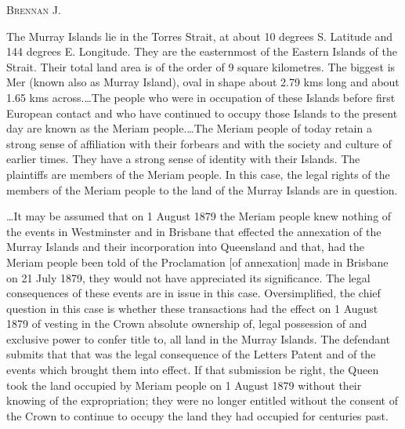 

\opinion \textsc{Brennan} J. 

The Murray Islands lie in the Torres Strait, at about 10 degrees S. Latitude and
144 degrees E. Longitude. They are the easternmost of the Eastern Islands of the
Strait. Their total land area is of the order of 9 square kilometres. The
biggest is Mer (known also as Murray Island), oval in shape about 2.79 kms long
and about 1.65 kms across.\ldots The people who were in occupation of these
Islands before first European contact and who have continued to occupy those
Islands to the present day are known as the Meriam people.\ldots The Meriam
people of today retain a strong sense of affiliation with their forbears and
with the society and culture of earlier times. They have a strong sense of
identity with their Islands. The plaintiffs are members of the Meriam people. In
this case, the legal rights of the members of the Meriam people to the land of
the Murray Islands are in question.

\ldots It may be assumed that on 1 August 1879 the Meriam people knew nothing of
the events in Westminster and in Brisbane that effected the annexation of the
Murray Islands and their incorporation into Queensland and that, had the Meriam
people been told of the Proclamation [of annexation] made in Brisbane on 21 July
1879, they would not have appreciated its significance. The legal consequences
of these events are in issue in this case. Oversimplified, the chief question in
this case is whether these transactions had the effect on 1 August 1879 of
vesting in the Crown absolute ownership of, legal possession of and exclusive
power to confer title to, all land in the Murray Islands. The defendant submits
that that was the legal consequence of the Letters Patent and of the events
which brought them into effect. If that submission be right, the Queen took the
land occupied by Meriam people on 1 August 1879 without their knowing of the
expropriation; they were no longer entitled without the consent of the Crown to
continue to occupy the land they had occupied for centuries past. 

